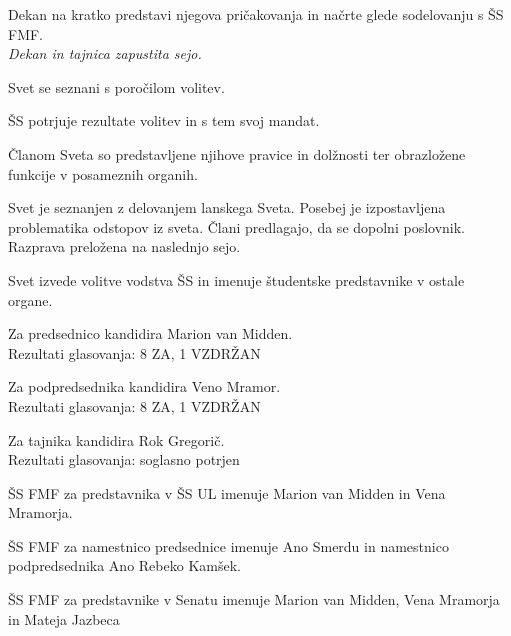 \documentclass{seja}
\begin{document}
\begin{ad}

\item
Dekan na kratko predstavi njegova pričakovanja in načrte glede sodelovanju s
ŠS FMF. \\ \textit{Dekan in tajnica zapustita sejo.}

\item Svet se seznani s poročilom volitev.

\begin{sklep*}
ŠS potrjuje rezultate volitev in s tem svoj mandat.
\end{sklep*}

\item
Članom Sveta so predstavljene njihove pravice in dolžnosti ter obrazložene
funkcije v posameznih organih.

\item
Svet  je  seznanjen  z  delovanjem  lanskega  Sveta.  Posebej  je  izpostavljena
problematika odstopov iz sveta. Člani predlagajo, da se dopolni poslovnik.
Razprava preložena na naslednjo sejo.

\item
Svet  izvede volitve vodstva ŠS in  imenuje študentske predstavnike v ostale organe.

Za predsednico kandidira Marion van Midden. \\
Rezultati glasovanja: 8 ZA, 1 VZDRŽAN

Za podpredsednika kandidira Veno Mramor. \\
Rezultati glasovanja: 8 ZA, 1 VZDRŽAN

Za tajnika kandidira Rok Gregorič.  \\
Rezultati glasovanja: soglasno potrjen

\begin{sklep*}
ŠS FMF za predstavnika v
ŠS UL imenuje Marion van Midden in Vena
Mramorja.
\end{sklep*}

\begin{sklep*}
ŠS FMF za namestnico predsednice imenuje Ano Smerdu in namestnico podpredsednika
Ano Rebeko Kamšek.
\end{sklep*}

\begin{sklep*}
ŠS  FMF  za  predstavnike  v  Senatu  imenuje Marion  van  Midden,
Vena Mramorja in Mateja Jazbeca
\end{sklep*}


\end{ad}
\end{document}
